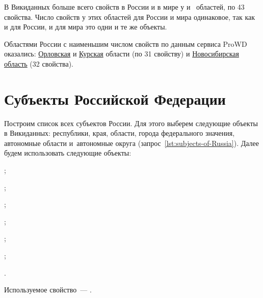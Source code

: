 \newpage
В Викиданных больше всего свойств в России и в мире у  
и~ областей, по 43 свойства\autocite{Russia_prowd}. 
Число свойств у этих областей для России и мира одинаковое, так как и для России, и для мира это одни и те же объекты.

Областями России с наименьшим числом свойств по данным сервиса ProWD оказались: 
\href{http://www.wikidata.org/entity/Q3129}{Орловская} и \href{http://www.wikidata.org/entity/Q3178}{Курская} области (по 31 свойству) и \href{http://www.wikidata.org/entity/Q5851}{Новосибирская область} (32 свойства).




\section{Субъекты Российской Федерации}

Построим список всех субъектов России. 
Для этого выберем следующие объекты в Викиданных: 
республики, края, области, города федерального значения, автономные области и~автономные округа (запрос~\ref{lst:subjects-of-Russia}). 
Далее будем использовать следующие объекты:
\begin{compactitemize}
	\item{};
	\item{};
	\item{};
	\item{};
	\item{};
	\item{};
	\item{}.
\end{compactitemize}
Используемое свойство~--- .

